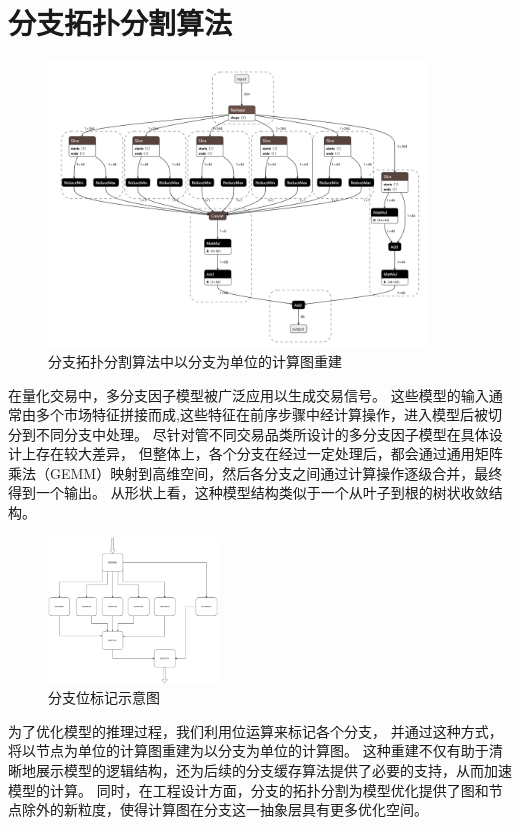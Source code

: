 \section{分支拓扑分割算法}
\begin{figure}[h]
    \centering
    \includegraphics[width=0.9\textwidth]{image/chap03/branchs.jpg}
    \caption{分支拓扑分割算法中以分支为单位的计算图重建}
    \label{fig:hole}
\end{figure}
在量化交易中，多分支因子模型被广泛应用以生成交易信号。
这些模型的输入通常由多个市场特征拼接而成,这些特征在前序步骤中经计算操作，进入模型后被切分到不同分支中处理。
尽针对管不同交易品类所设计的多分支因子模型在具体设计上存在较大差异，
但整体上，各个分支在经过一定处理后，都会通过通用矩阵乘法（GEMM）映射到高维空间，然后各分支之间通过计算操作逐级合并，最终得到一个输出。
从形状上看，这种模型结构类似于一个从叶子到根的树状收敛结构。
\begin{figure}
    \centering
    \includegraphics[width=0.4\textwidth]{image/chap03/branch2.jpg}
    \caption{分支位标记示意图}
    \label{fig:image-embedding-text}
\end{figure}
为了优化模型的推理过程，我们利用位运算来标记各个分支，
并通过这种方式，将以节点为单位的计算图重建为以分支为单位的计算图。
这种重建不仅有助于清晰地展示模型的逻辑结构，还为后续的分支缓存算法提供了必要的支持，从而加速模型的计算。
同时，在工程设计方面，分支的拓扑分割为模型优化提供了图和节点除外的新粒度，使得计算图在分支这一抽象层具有更多优化空间。


